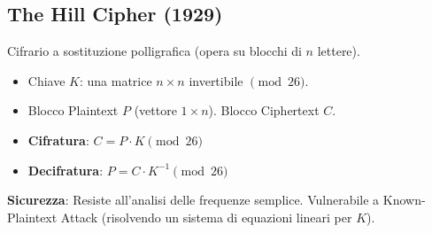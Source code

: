 \documentclass{article}
\begin{document}
\subsection{The Hill Cipher (1929)}
Cifrario a sostituzione polligrafica (opera su blocchi di $n$ lettere).
\begin{itemize}
    \item Chiave $K$: una matrice $n \times n$ invertibile $\pmod{26}$.
    \item Blocco Plaintext $P$ (vettore $1 \times n$). Blocco Ciphertext $C$.
    \item \textbf{Cifratura}: $C = P \cdot K \pmod{26}$
    \item \textbf{Decifratura}: $P = C \cdot K^{-1} \pmod{26}$
\end{itemize}
\textbf{Sicurezza}: Resiste all'analisi delle frequenze semplice. Vulnerabile a Known-Plaintext Attack (risolvendo un sistema di equazioni lineari per $K$).
\end{document}
